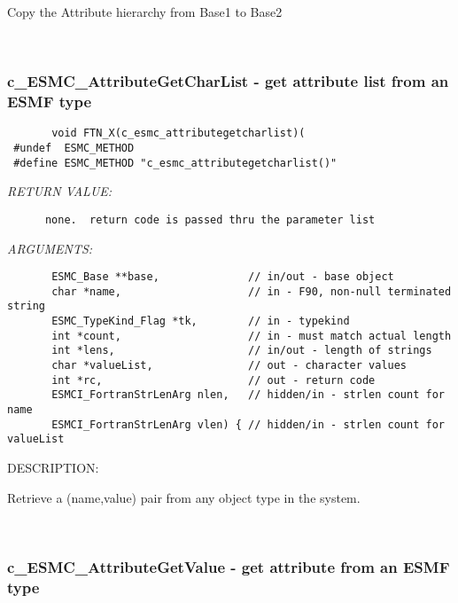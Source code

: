       Copy the Attribute hierarchy from Base1 to Base2
   
 
\mbox{}\hrulefill\ 
 
\subsubsection [c\_ESMC\_AttributeGetCharList] {c\_ESMC\_AttributeGetCharList - get attribute list from an ESMF type}


  
\begin{verbatim}       void FTN_X(c_esmc_attributegetcharlist)(
 #undef  ESMC_METHOD
 #define ESMC_METHOD "c_esmc_attributegetcharlist()"\end{verbatim}{\em RETURN VALUE:}
\begin{verbatim}      none.  return code is passed thru the parameter list
   \end{verbatim}{\em ARGUMENTS:}
\begin{verbatim}       ESMC_Base **base,              // in/out - base object
       char *name,                    // in - F90, non-null terminated string
       ESMC_TypeKind_Flag *tk,        // in - typekind
       int *count,                    // in - must match actual length
       int *lens,                     // in/out - length of strings
       char *valueList,               // out - character values
       int *rc,                       // out - return code
       ESMCI_FortranStrLenArg nlen,   // hidden/in - strlen count for name
       ESMCI_FortranStrLenArg vlen) { // hidden/in - strlen count for valueList
   \end{verbatim}
{\sf DESCRIPTION:\\ }


       Retrieve a (name,value) pair from any object type in the system.
   
 
\mbox{}\hrulefill\ 
 
\subsubsection [c\_ESMC\_AttributeGetValue] {c\_ESMC\_AttributeGetValue - get attribute from an ESMF type}


